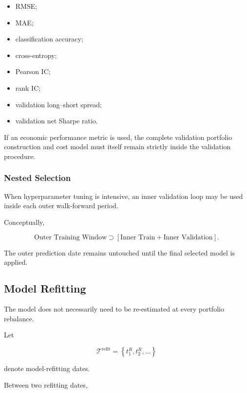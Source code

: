 \documentclass[11pt,a4paper]{article}
\begin{document}
\begin{itemize}
    \item RMSE;
    \item MAE;
    \item classification accuracy;
    \item cross-entropy;
    \item Pearson IC;
    \item rank IC;
    \item validation long--short spread;
    \item validation net Sharpe ratio.
\end{itemize}

If an economic performance metric is used, the complete validation portfolio
construction and cost model must itself remain strictly inside the validation
procedure.


\subsubsection{Nested Selection}

When hyperparameter tuning is intensive, an inner validation loop may be used
inside each outer walk-forward period.

Conceptually,

\begin{equation}
\boxed{
\text{Outer Training Window}
\supset
\left[
\text{Inner Train}
+
\text{Inner Validation}
\right].
}
\end{equation}

The outer prediction date remains untouched until the final selected model is
applied.


\subsection{Model Refitting}
\label{subsec:model_refitting}

The model does not necessarily need to be re-estimated at every portfolio
rebalance.

Let

\begin{equation}
\mathcal{T}^{\mathrm{refit}}
=
\left\{
t_1^{R},
t_2^{R},
\ldots
\right\}
\end{equation}

denote model-refitting dates.

Between two refitting dates,
\end{document}
